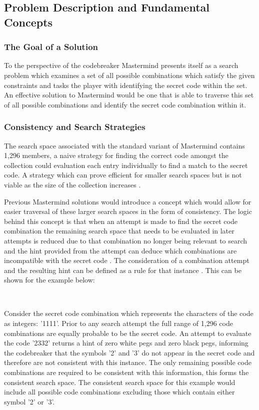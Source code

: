 \documentclass[11pt]{article}  %
\theoremstyle{definition}
\theoremstyle{remark}
\begin{document}
\subsection {Problem Description and Fundamental Concepts}

\subsubsection {The Goal of a Solution}
To the perspective of the codebreaker Mastermind presents itself as a search problem which examines a set of all possible combinations which satisfy the given constraints and tasks the player with identifying the secret code within the set. An effective solution to Mastermind would be one that is able to traverse this set of all possible combinations and identify the secret code combination within it.

\subsubsection {Consistency and Search Strategies}

The search space associated with the standard variant of Mastermind contains 1,296 members, a naive strategy for finding the correct code amongst the collection could evaluation each entry individually to find a match to the secret code. A strategy which can prove efficient for smaller search spaces but is not viable as the size of the collection increases \cite{Two Peg}.

Previous Mastermind solutions would introduce a concept which would allow for easier traversal of these larger search spaces in the form of consistency. The logic behind this concept is that when an attempt is made to find the secret code combination the remaining search space that needs to be evaluated in later attempts is reduced due to that combination no longer being relevant to search and the hint provided from the attempt can deduce which combinations are incompatible with the secret code \cite {Merelo}. The consideration of a combination attempt and the resulting hint can be defined as a rule for that instance \cite {Haystack}. This can be shown for the example below:

\

Consider the secret code combination which represents the characters of the code as integers: '1111'. Prior to any search attempt the full range of 1,296 code combinations are equally probable to be the secret code. An attempt to evaluate the code '2332' returns a hint of zero white pegs and zero black pegs, informing the codebreaker that the symbols '2' and '3' do not appear in the secret code and therefore are not consistent with this instance. The only remaining possible code combinations are required to be consistent with this information, this forms the consistent search space. The consistent search space for this example would include all possible code combinations excluding those which contain either symbol '2' or '3'.
\end{document}
